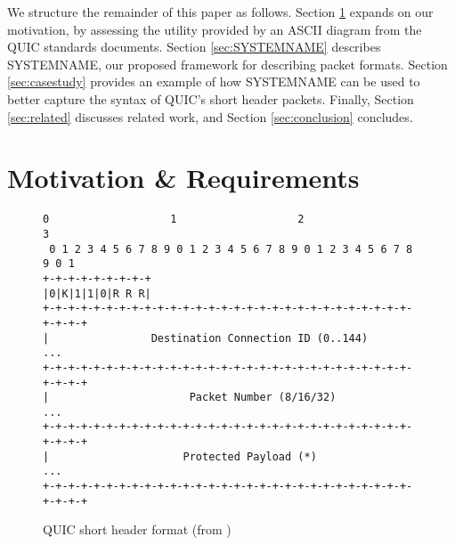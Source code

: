 \documentclass[10pt,sigconf]{acmart}
\begin{document}

We structure the remainder of this paper as follows. Section \ref{sec:motivation} expands
on our motivation, by assessing the utility provided by an ASCII diagram from the QUIC
standards documents. Section \ref{sec:SYSTEMNAME} describes SYSTEMNAME, our proposed
framework for describing packet formats. Section \ref{sec:casestudy} provides an example
of how SYSTEMNAME can be used to better capture the syntax of QUIC's short header packets.
Finally, Section \ref{sec:related} discusses related work, and Section
\ref{sec:conclusion} concludes.

%
%

\section{Motivation \& Requirements}
\label{sec:motivation}

\begin{figure}
	\centering
	\vspace{3mm}
    \begin{BVerbatim}[fontsize=\scriptsize]
 0                   1                   2                   3
 0 1 2 3 4 5 6 7 8 9 0 1 2 3 4 5 6 7 8 9 0 1 2 3 4 5 6 7 8 9 0 1
+-+-+-+-+-+-+-+-+
|0|K|1|1|0|R R R|
+-+-+-+-+-+-+-+-+-+-+-+-+-+-+-+-+-+-+-+-+-+-+-+-+-+-+-+-+-+-+-+-+
|                Destination Connection ID (0..144)           ...
+-+-+-+-+-+-+-+-+-+-+-+-+-+-+-+-+-+-+-+-+-+-+-+-+-+-+-+-+-+-+-+-+
|                      Packet Number (8/16/32)                ...
+-+-+-+-+-+-+-+-+-+-+-+-+-+-+-+-+-+-+-+-+-+-+-+-+-+-+-+-+-+-+-+-+
|                     Protected Payload (*)                   ...
+-+-+-+-+-+-+-+-+-+-+-+-+-+-+-+-+-+-+-+-+-+-+-+-+-+-+-+-+-+-+-+-+
    \end{BVerbatim}
    \caption{QUIC short header format (from \cite{draft-ietf-quic-transport-latest})}
    \label{fig:quic-short-hdr}
\end{figure}
\end{document}

